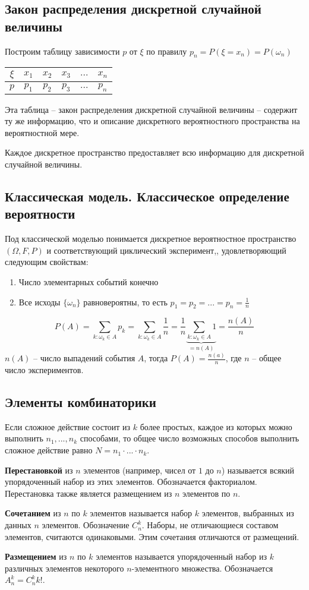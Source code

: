 \subsection{Закон распределения дискретной случайной величины}
Построим таблицу зависимости $p$ от $\xi$ по правилу $p_n=P(\xi=x_n)=P(\omega_n)$
\begin{tabular}{c|ccccc}
$\xi$ & $x_1$ & $x_2$ & $x_3$ & $...$ & $x_n$\\
\hline
$p$ & $p_1$ & $p_2$ & $p_3$ & $...$ & $p_n$
\end{tabular}
Эта таблица -- закон распределения дискретной случайной величины -- содержит ту же информацию, что и описание дискретного вероятностного пространства на вероятностной мере.

Каждое дискретное пространство предоставляет всю информацию для дискретной случайной величины.
\subsection{Классическая модель. Классическое определение вероятности}
Под классической моделью понимается дискретное вероятностное пространство $(\Omega,F,P)$ и соответствующий циклический эксперимент,, удовлетворяющий следующим свойствам:
\begin{enumerate}
 \item Число элементарных событий конечно
 \item Все исходы $\{\omega_n\}$ равновероятны, то есть $p_1=p_2=...=p_n=\frac{1}{n}$
\end{enumerate}
$$P(A)=\sum\limits_{k:\omega_k\in A}p_k=\sum\limits_{k:\omega_k\in A}\frac{1}{n}=\frac{1}{n}\underbrace{\sum\limits_{k:\omega_k\in A}1}_{=n(A)}=\frac{n(A)}{n}$$
$n(A)$ -- число выпадений события $A$, тогда $P(A)=\frac{n(a)}{n}$, где $n$ -- общее число экспериментов.
\subsection{Элементы комбинаторики}
Если сложное действие состоит из  $k$ более простых, каждое из которых можно выполнить $n_1,...,n_k$ способами, то общее число возможных способов выполнить сложное действие равно $N=n_1\cdot...\cdot n_k$.
\begin{definition}
\textbf{Перестановкой} из $n$ элементов (например, чисел от $1$ до $n$) называется всякий упорядоченный набор из этих элементов. Обозначается факториалом. Перестановка также является размещением из $n$ элементов по $n$.
\end{definition}
\begin{definition}
\textbf{Сочетанием} из $n$ по $k$ элементов называется набор $k$ элементов, выбранных из данных $n$ элементов. Обозначение $C_n^k$. Наборы, не отличающиеся составом элементов, считаются одинаковыми. Этим сочетания отличаются от размещений.
\end{definition}
\begin{definition}
\textbf{Размещением} из $n$ по $k$ элементов называется упорядоченный набор из $k$ различных элементов некоторого $n$-элементного множества. Обозначается $A_n^k = C_n^k k!$.
\end{definition}
